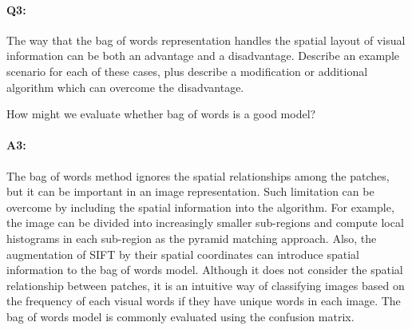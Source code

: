 
\pagebreak
\paragraph{Q3:} The way that the bag of words representation handles the spatial layout of visual information can be both an advantage and a disadvantage. Describe an example scenario for each of these cases, plus describe a modification or additional algorithm which can overcome the disadvantage. 

How might we evaluate whether bag of words is a good model?

\paragraph{A3:} The bag of words method ignores the spatial relationships among the patches, but it can be important in an image representation. Such limitation can be overcome by including the spatial information into the algorithm. For example, the image can be divided into increasingly smaller sub-regions and compute local histograms in each sub-region as the pyramid matching approach. Also, the augmentation of SIFT by their spatial coordinates can introduce spatial information to the bag of words model. Although it does not consider the spatial relationship between patches, it is an intuitive way of classifying images based on the frequency of each visual words if they have unique words in each image. The bag of words model is commonly evaluated using the confusion matrix. 








